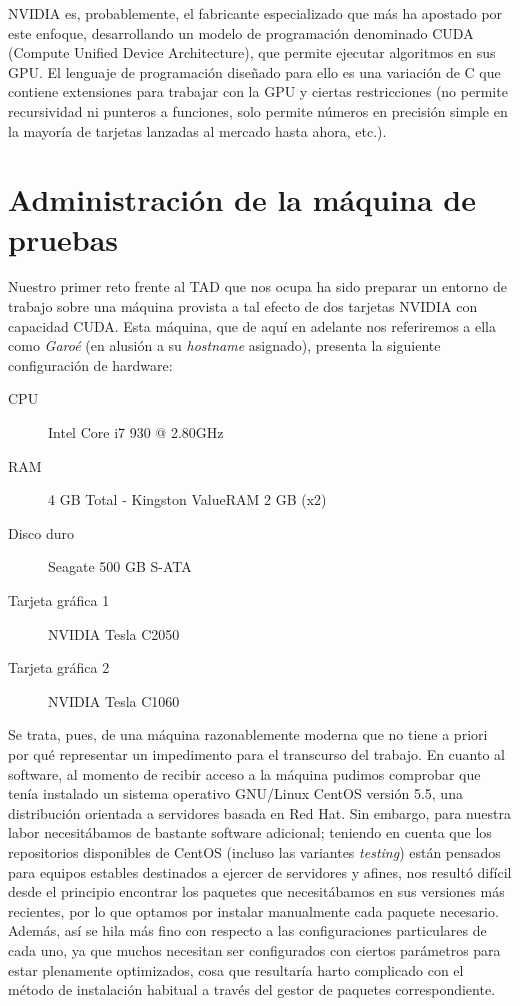 \documentclass[twoside]{article}
\begin{document}
\vspace{5 mm}

NVIDIA es, probablemente, el fabricante especializado que más ha apostado por este enfoque, desarrollando un modelo de programación denominado CUDA (Compute Unified Device Architecture), que permite ejecutar algoritmos en sus GPU. El lenguaje de programación diseñado para ello es una variación de C que contiene extensiones para trabajar con la GPU y ciertas restricciones (no permite recursividad ni punteros a funciones, solo permite números en precisión simple en la mayoría de tarjetas lanzadas al mercado hasta ahora, etc.).


\section{Administración de la máquina de pruebas}

Nuestro primer reto frente al TAD que nos ocupa ha sido preparar un entorno de trabajo sobre una máquina provista a tal efecto de dos tarjetas NVIDIA con capacidad CUDA. Esta máquina, que de aquí en adelante nos referiremos a ella como \emph{Garoé} (en alusión a su \emph{hostname} asignado), presenta la siguiente configuración de hardware:

\begin{description}
   \item[CPU] Intel Core i7 930 @ 2.80GHz
   \item[RAM] 4 GB Total - Kingston ValueRAM 2 GB (x2)
   \item[Disco duro] Seagate 500 GB S-ATA
   \item[Tarjeta gráfica 1] NVIDIA Tesla C2050
   \item[Tarjeta gráfica 2] NVIDIA Tesla C1060
\end{description}

Se trata, pues, de una máquina razonablemente moderna que no tiene a priori por qué representar un impedimento para el transcurso del trabajo. En cuanto al software, al momento de recibir acceso a la máquina pudimos comprobar que tenía instalado un sistema operativo GNU/Linux CentOS versión 5.5, una distribución orientada a servidores basada en Red Hat. Sin embargo, para nuestra labor necesitábamos de bastante software adicional; teniendo en cuenta que los repositorios disponibles de CentOS (incluso las variantes \emph{testing}) están pensados para equipos estables destinados a ejercer de servidores y afines, nos resultó difícil desde el principio encontrar los paquetes que necesitábamos en sus versiones más recientes, por lo que optamos por instalar manualmente cada paquete necesario. Además, así se hila más fino con respecto a las configuraciones particulares de cada uno, ya que muchos necesitan ser configurados con ciertos parámetros para estar plenamente optimizados, cosa que resultaría harto complicado con el método de instalación habitual a través del gestor de paquetes correspondiente.
\end{document}
